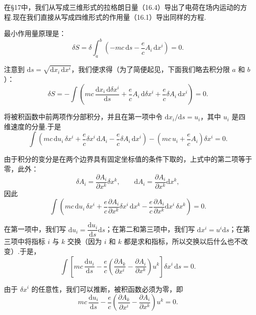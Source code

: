 在§17中，我们从写成三维形式的拉格朗日量（16.4）导出了电荷在场内运动的方程.现在我们直接从写成四维形式的作用量（16.1）导出同样的方程.

最小作用量原理是：
\begin{equation}
  \delta S=\delta\int_a^b\left(-mc\,\mathrm{d}s-\frac{e}{c}A_i\,\mathrm{d}x^i\right)=0.
\end{equation}

注意到 $\mathrm{d}s=\sqrt{\mathrm{d}x_i\,\mathrm{d}x^i}$，我们便求得（为了简便起见，下面我们略去积分限 $a$ 和
$b$）：
\begin{equation*}
  \delta S=-\int\left(mc\,\frac{\mathrm{d}x_i\,\mathrm{d}\delta x^i}{\mathrm{d}s}
  +\frac{e}{c}A_i\,\mathrm{d}\delta x^i
  +\frac{e}{c}\delta A_i\,\mathrm{d}x^i\right)=0.
\end{equation*}

将被积函数中前两项作分部积分，并且在第一项中令 $\mathrm{d}x_i/\mathrm{d}s=u_i$，其中 $u_i$
是四维速度的分量.于是
\begin{equation}
  \int\left(mc\,\mathrm{d}u_i\,\delta x^i+\frac{e}{c}\delta x^i\,\mathrm{d}A_i
  -\frac{e}{c}\delta A_i\,\mathrm{d}x^i\right)
  -\left(mc\,u_i+\frac{e}{c}A_i\right)\delta x^i=0.
\end{equation}

由于积分的变分是在两个边界具有固定坐标值的条件下取的，上式中的第二项等于零，此外：
\begin{equation*}
  \delta A_i=\frac{\partial A_i}{\partial x^k}\delta x^k,\qquad
  \mathrm{d}A_i=\frac{\partial A_i}{\partial x^k}\mathrm{d}x^k,
\end{equation*}
因此
\begin{equation*}
  \int\left(mc\,\mathrm{d}u_i\,\delta x^i
  +\frac{e}{c}\frac{\partial A_i}{\partial x^k}\delta x^i\,\mathrm{d}x^k
  -\frac{e}{c}\frac{\partial A_i}{\partial x^k}\mathrm{d}x^i\,\delta x^k\right)=0.
\end{equation*}

在第一项中，我们写 $\mathrm{d}u_i=\dfrac{\mathrm{d}u_i}{\mathrm{d}s}\mathrm{d}s$；在第二和第三项中，我们写
$\mathrm{d}x^i=u^i\mathrm{d}s$；在第三项中将指标 $i$ 与 $k$ 交换（因为 $i$ 和 $k$
都是求和指标，所以交换以后什么也不改变）.于是，
\begin{equation*}
  \int\left[mc\,\frac{\mathrm{d}u_i}{\mathrm{d}s}
  -\frac{e}{c}\left(\frac{\partial A_k}{\partial x^i}
  -\frac{\partial A_i}{\partial x^k}\right)u^k\right]\delta x^i\,\mathrm{d}s=0.
\end{equation*}

由于 $\delta x^i$ 的任意性，我们可以推断，被积函数必须为零，即
\begin{equation*}
  mc\,\frac{\mathrm{d}u_i}{\mathrm{d}s}
  -\frac{e}{c}\left(\frac{\partial A_k}{\partial x^i}
  -\frac{\partial A_i}{\partial x^k}\right)u^k=0.
\end{equation*}

